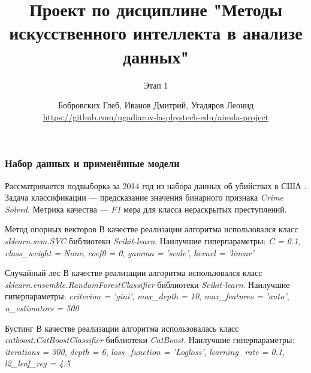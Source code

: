 \documentclass[aspectratio=169,8pt]{beamer}
\title[Проект по дисциплине МИИАД] {Проект по дисциплине "Методы искусственного интеллекта в анализе данных"}
\subtitle{Этап 1}
\author[Бобровских, Иванов, Угадяров] {Бобровских Глеб, Иванов Дмитрий, Угадяров Леонид \\ \tiny\url{https://github.com/ugadiarov-la-phystech-edu/aimda-project}}
\institute{Группа 4}
\begin{document}
\begin{frame}
\titlepage
\end{frame}

\begin{frame}
\frametitle{Набор данных и применённые модели}

Рассматривается подвыборка за 2014 год из набора данных об убийствах в США \href{https://www.kaggle.com/murderaccountability/homicide-reports}{\color{blue}{Homicide Reports, 1980-2014}}.
\newline Задача классификации --- предсказание значения бинарного признака \emph {Crime Solved}.
\newline Метрика качества --- \emph {F1} мера для класса нераскрытых преступлений.

\begin{block}{Метод опорных векторов}
В качестве реализации алгоритма использовался класс \emph {sklearn.svm.SVC} библиотеки \emph {Scikit-learn}. Наилучшие гиперпараметры\footnotemark:
\newline \emph {C = 0.1}, \emph {class\_weight = None}, \emph {coef0 = 0}, \emph {gamma = 'scale'}, \emph {kernel = 'linear'}
\end{block}

\begin{block}{Случайный лес}
В качестве реализации алгоритма использовался класс \emph {sklearn.ensemble.RandomForestClassifier} библиотеки \emph {Scikit-learn}. Наилучшие гиперпараметры\footnotemark[1]:
\newline \emph {criterion = 'gini'}, \emph {max\_depth = 10}, \emph {max\_features = 'auto'}, \emph {n\_estimators = 500}
\end{block}

\begin{block}{Бустинг}
В качестве реализации алгоритма использовалась класс \emph {catboost.CatBoostClassifier} библиотеки \emph {CatBoost}. Наилучшие гиперпараметры\footnotemark[1]:
\newline \emph {iterations = 300}, \emph {depth = 6}, \emph {loss\_function = 'Logloss'}, \emph {learning\_rate = 0.1}, \emph {l2\_leaf\_reg = 4.5}
\end{block}


\end{frame}
\end{document}
